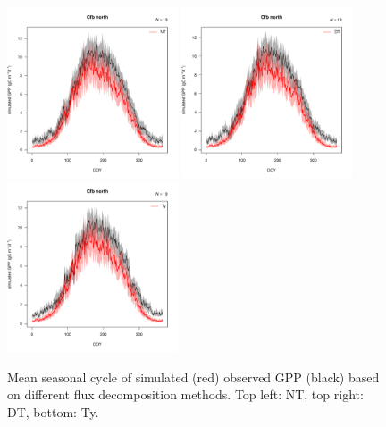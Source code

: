 \documentclass{myreport}
\begin{document}
 \begin{figure}[!ht]
\includegraphics[width=0.45\textwidth]{fig/meandoy_byzone_Cfb_north_NT.pdf}
\includegraphics[width=0.45\textwidth]{fig/meandoy_byzone_Cfb_north_DT.pdf}\\
\includegraphics[width=0.45\textwidth]{fig/meandoy_byzone_Cfb_north_Ty.pdf}
    \caption{Mean seasonal cycle of simulated (red) observed GPP (black) based on different flux decomposition methods. Top left: NT, top right: DT, bottom: Ty.}
    \label{fig:season3}
\end{figure}
\end{document}
